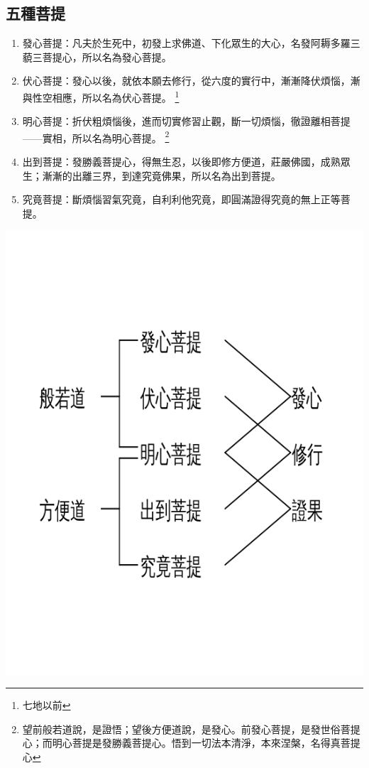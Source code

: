 \subsection{五種菩提}
\begin{enumerate}
  \item 發心菩提：凡夫於生死中，初發上求佛道、下化眾生的大心，名發阿耨多羅三藐三菩提心，所以名為發心菩提。
  \item 伏心菩提：發心以後，就依本願去修行，從六度的實行中，漸漸降伏煩惱，漸與性空相應，所以名為伏心菩提。
    \footnote{七地以前}
  \item 明心菩提：折伏粗煩惱後，進而切實修習止觀，斷一切煩惱，徹證離相菩提——實相，所以名為明心菩提。
    \footnote{望前般若道說，是證悟；望後方便道說，是發心。前發心菩提，是發世俗菩提心；而明心菩提是發勝義菩提心。悟到一切法本清淨，本來涅槃，名得真菩提心}
  \item 出到菩提：發勝義菩提心，得無生忍，以後即修方便道，莊嚴佛國，成熟眾生；漸漸的出離三界，到達究竟佛果，所以名為出到菩提。
  \item 究竟菩提：斷煩惱習氣究竟，自利利他究竟，即圓滿證得究竟的無上正等菩提。
\end{enumerate}
\includegraphics[scale=0.5]{释家/images/五種菩提.png}

